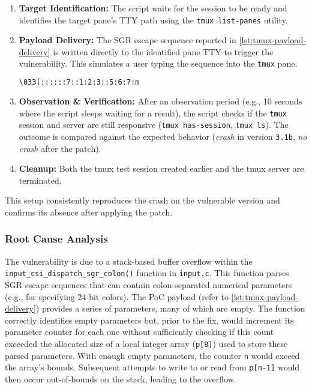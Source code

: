 \documentclass[11pt,a4paper,twocolumn]{article}
\begin{document}
\begin{enumerate}
	\item \textbf{Target Identification:} The script waits for the session to be ready and identifies the target pane's TTY path using the \texttt{tmux list-panes} utility.

	\item \textbf{Payload Delivery:} The SGR escape sequence reported in \autoref{lst:tmux-payload-delivery} is written directly to the identified pane TTY to trigger the vulnerability. This simulates a user typing the sequence into the \texttt{tmux} pane.

	      \begin{lstlisting}[language=bash, caption=Payload sent to the tmux pane, label={lst:tmux-payload-delivery}]
\033[::::::7::1:2:3::5:6:7:m
\end{lstlisting}

	\item \textbf{Observation \& Verification:} After an observation period (e.g., 10 seconds where the script sleeps waiting for a result), the script checks if the \texttt{tmux} session and server are still responsive (\texttt{tmux has-session}, \texttt{tmux ls}). The outcome is compared against the expected behavior (\emph{crash} in version \texttt{3.1b}, \emph{no crash} after the patch).

	\item \textbf{Cleanup:} Both the tmux test session created earlier and the tmux server are terminated.
\end{enumerate}

This setup consistently reproduces the crash on the vulnerable version and confirms its absence after applying the patch.

\subsubsection*{Root Cause Analysis}

The vulnerability is due to a stack-based buffer overflow within the \texttt{input\_csi\_dispatch\_sgr\_colon()} function in \texttt{input.c}. This function parses SGR escape sequences that can contain colon-separated numerical parameters (e.g., for specifying 24-bit colors). The PoC payload (refer to \autoref{lst:tmux-payload-delivery}) provides a series of parameters, many of which are empty. The function correctly identifies empty parameters but, prior to the fix, would increment its parameter counter for each one without sufficiently checking if this count exceeded the allocated size of a local integer array (\texttt{p[8]}) used to store these parsed parameters. With enough empty parameters, the counter \texttt{n} would exceed the array's bounds. Subsequent attempts to write to or read from \texttt{p[n-1]} would then occur out-of-bounds on the stack, leading to the overflow.
\end{document}
